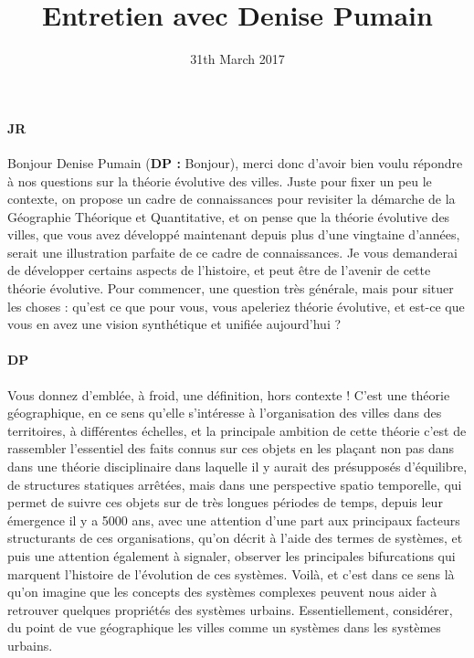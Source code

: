 \documentclass[12pt]{article}
\title{Entretien avec Denise Pumain}
\date{31th March 2017}
\begin{document}
\maketitle

\paragraph{JR}

Bonjour Denise Pumain (\textbf{DP : } Bonjour), merci donc d'avoir bien voulu répondre à nos questions sur la théorie évolutive des villes. Juste pour fixer un peu le contexte, on propose un cadre de connaissances pour revisiter la démarche de la Géographie Théorique et Quantitative, et on pense que la théorie évolutive des villes, que vous avez développé maintenant depuis plus d'une vingtaine d'années, serait une illustration parfaite de ce cadre de connaissances. Je vous demanderai de développer certains aspects de l'histoire, et peut être de l'avenir de cette théorie évolutive. Pour commencer, une question très générale, mais pour situer les choses : qu'est ce que pour vous, vous apeleriez théorie évolutive, et est-ce que vous en avez une vision synthétique et unifiée aujourd'hui ?


\paragraph{DP}

Vous donnez d'emblée, à froid, une définition, hors contexte ! C'est une théorie géographique, en ce sens qu'elle s'intéresse à l'organisation des villes dans des territoires, à différentes échelles, et la principale ambition de cette théorie c'est de rassembler l'essentiel des faits connus sur ces objets en les plaçant non pas dans dans une théorie disciplinaire dans laquelle il y aurait des présupposés d'équilibre, de structures statiques arrêtées, mais dans une perspective spatio temporelle, qui permet de suivre ces objets sur de très longues périodes de temps, depuis leur émergence il y a 5000 ans, avec une attention d'une part aux principaux facteurs structurants de ces organisations, qu'on décrit à l'aide des termes de systèmes, et puis une attention également à signaler, observer les principales bifurcations qui marquent l'histoire de l'évolution de ces systèmes. Voilà, et c'est dans ce sens là qu'on imagine que les concepts des systèmes complexes peuvent nous aider à retrouver quelques propriétés des systèmes urbains. Essentiellement, considérer, du point de vue géographique les villes comme un systèmes dans les systèmes urbains.
\end{document}
